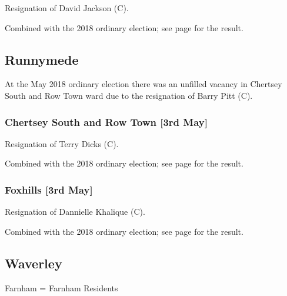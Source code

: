 \documentclass[a4paper,openany]{book}
\begin{document}
\begin{resultsiii}

Resignation of David Jackson (C).

Combined with the 2018 ordinary election; see page \pageref{HorleyWestReigateBanstead} for the result.

\subsection*{Runnymede}

At the May 2018 ordinary election there was an unfilled vacancy in Chertsey South and Row Town ward due to the resignation of Barry Pitt (C).

\subsubsection*{Chertsey South and Row Town \hspace*{\fill}\nolinebreak[1]%
\enspace\hspace*{\fill}
[3rd May]}


Resignation of Terry Dicks (C).

Combined with the 2018 ordinary election; see page \pageref{ChertseySouthRowTownRunnymede} for the result.

\subsubsection*{Foxhills \hspace*{\fill}\nolinebreak[1]%
\enspace\hspace*{\fill}
[3rd May]}


Resignation of Dannielle Khalique (C).

Combined with the 2018 ordinary election; see page \pageref{FoxhillsRunnymede} for the result.

\subsection*{Waverley}

Farnham = Farnham Residents


\end{resultsiii}
\end{document}
